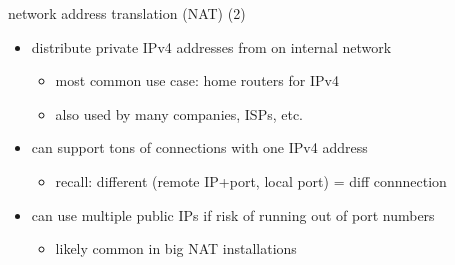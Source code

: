 \begin{frame}{network address translation (NAT) (2)}
    \begin{itemize}
    \item distribute private IPv4 addresses from on internal network
        \begin{itemize}
        \item most common use case: home routers for IPv4
        \item also used by many companies, ISPs, etc.
        \end{itemize}
    \item can support tons of connections with one IPv4 address
        \begin{itemize}
        \item recall: different (remote IP+port, local port) = diff connnection
        \end{itemize}
    \item can use multiple public IPs if risk of running out of port numbers
        \begin{itemize}
        \item likely common in big NAT installations
        \end{itemize}
    \end{itemize}
\end{frame}


